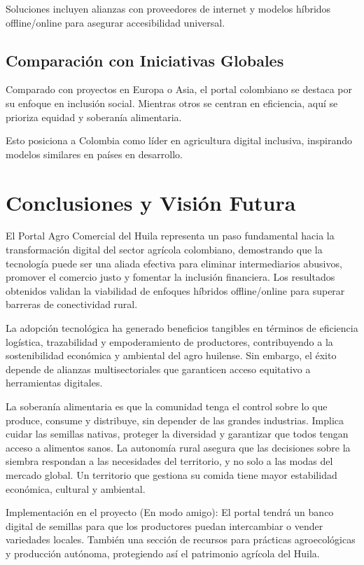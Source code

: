Soluciones incluyen alianzas con proveedores de internet y modelos híbridos offline/online para asegurar accesibilidad universal.

\subsection{Comparación con Iniciativas Globales}
Comparado con proyectos en Europa o Asia, el portal colombiano se destaca por su enfoque en inclusión social. Mientras otros se centran en eficiencia, aquí se prioriza equidad y soberanía alimentaria.

Esto posiciona a Colombia como líder en agricultura digital inclusiva, inspirando modelos similares en países en desarrollo.

\section{Conclusiones y Visión Futura}

El Portal Agro Comercial del Huila representa un paso fundamental hacia la transformación digital del sector agrícola colombiano, demostrando que la tecnología puede ser una aliada efectiva para eliminar intermediarios abusivos, promover el comercio justo y fomentar la inclusión financiera. Los resultados obtenidos validan la viabilidad de enfoques híbridos offline/online para superar barreras de conectividad rural.

La adopción tecnológica ha generado beneficios tangibles en términos de eficiencia logística, trazabilidad y empoderamiento de productores, contribuyendo a la sostenibilidad económica y ambiental del agro huilense. Sin embargo, el éxito depende de alianzas multisectoriales que garanticen acceso equitativo a herramientas digitales.

La soberanía alimentaria es que la comunidad tenga el control sobre lo que produce, consume y distribuye, sin depender de las grandes industrias. Implica cuidar las semillas nativas, proteger la diversidad y garantizar que todos tengan acceso a alimentos sanos. La autonomía rural asegura que las decisiones sobre la siembra respondan a las necesidades del territorio, y no solo a las modas del mercado global. Un territorio que gestiona su comida tiene mayor estabilidad económica, cultural y ambiental.

Implementación en el proyecto (En modo amigo): El portal tendrá un banco digital de semillas para que los productores puedan intercambiar o vender variedades locales. También una sección de recursos para prácticas agroecológicas y producción autónoma, protegiendo así el patrimonio agrícola del Huila.

